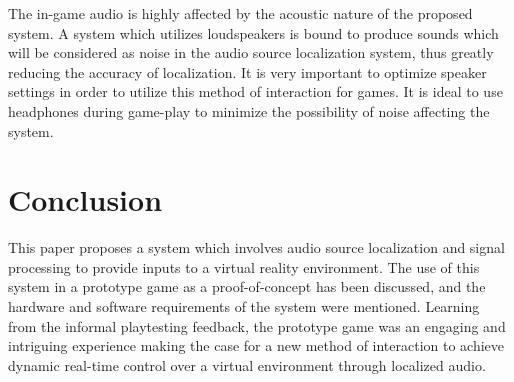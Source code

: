 \documentclass[convention]{aesconf}
\begin{document}
The in-game audio is highly affected by the acoustic nature of the proposed system. A system which utilizes loudspeakers is bound to produce sounds which will be considered as noise in the audio source localization system, thus greatly reducing the accuracy of localization. It is very important to optimize speaker settings in order to utilize this method of interaction for games. It is ideal to use headphones during game-play to minimize the possibility of noise affecting the system.

\section{Conclusion}
This paper proposes a system which involves audio source localization and signal processing to provide inputs to a virtual reality environment. The use of this system in a prototype game as a proof-of-concept has been discussed, and the hardware and software requirements of the system were mentioned. Learning from the informal playtesting feedback, the prototype game was an engaging and intriguing experience making the case for a new method of interaction to achieve dynamic real-time control over a virtual environment through localized audio.




\end{document}
